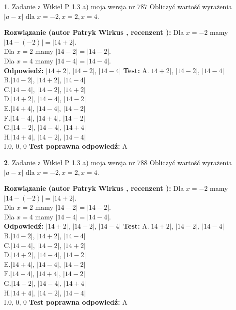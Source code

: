 \documentclass[12pt, a4paper]{article}
\theoremstyle{definition} %
\newtheorem{zad}{}
\newcommand{\zadStart}[1]{\begin{zad}#1\newline}
\newcommand{\zadStop}{\end{zad}}
\newcommand{\rozwStart}[2]{\noindent \textbf{Rozwiązanie (autor #1 , recenzent #2): }\newline}
\newcommand{\rozwStop}{\newline}
\newcommand{\odpStart}{\noindent \textbf{Odpowiedź:}\newline}
\newcommand{\odpStop}{\newline}
\newcommand{\testStart}{\noindent \textbf{Test:}\newline}
\newcommand{\testStop}{\newline}
\newcommand{\kluczStart}{\noindent \textbf{Test poprawna odpowiedź:}\newline}
\newcommand{\kluczStop}{\newline}
\begin{document}
\zadStart{Zadanie z Wikieł P 1.3 a) moja wersja nr 787}
Obliczyć wartość wyrażenia $|a - x|$ dla $x=-2,x=2,x=4$.
\zadStop
\rozwStart{Patryk Wirkus}{}
Dla $x = -2$ mamy $|14 - (-2)| = |14 + 2|$.\\
Dla $x = 2$ mamy $|14 - 2| = |14 - 2|$.\\
Dla $x = 4$ mamy $|14 - 4| = |14 - 4|$.\\
\rozwStop
\odpStart
$|14 + 2|$, $|14 - 2|$, $|14 - 4|$
\odpStop
\testStart
A.$|14 + 2|$, $|14 - 2|$, $|14 - 4|$\\
B.$|14 - 2|$, $|14 + 2|$, $|14 - 4|$\\
C.$|14 - 4|$, $|14 - 2|$, $|14 + 2|$\\
D.$|14 + 2|$, $|14 - 4|$, $|14 - 2|$\\
E.$|14 + 4|$, $|14 - 4|$, $|14 - 2|$\\
F.$|14 - 4|$, $|14 + 4|$, $|14 - 2|$\\
G.$|14 - 2|$, $|14 - 4|$, $|14 + 4|$\\
H.$|14 + 4|$, $|14 - 2|$, $|14 - 4|$\\
I.$0$, $0$, $0$
\testStop
\kluczStart
A
\kluczStop



\zadStart{Zadanie z Wikieł P 1.3 a) moja wersja nr 788}
Obliczyć wartość wyrażenia $|a - x|$ dla $x=-2,x=2,x=4$.
\zadStop
\rozwStart{Patryk Wirkus}{}
Dla $x = -2$ mamy $|14 - (-2)| = |14 + 2|$.\\
Dla $x = 2$ mamy $|14 - 2| = |14 - 2|$.\\
Dla $x = 4$ mamy $|14 - 4| = |14 - 4|$.\\
\rozwStop
\odpStart
$|14 + 2|$, $|14 - 2|$, $|14 - 4|$
\odpStop
\testStart
A.$|14 + 2|$, $|14 - 2|$, $|14 - 4|$\\
B.$|14 - 2|$, $|14 + 2|$, $|14 - 4|$\\
C.$|14 - 4|$, $|14 - 2|$, $|14 + 2|$\\
D.$|14 + 2|$, $|14 - 4|$, $|14 - 2|$\\
E.$|14 + 4|$, $|14 - 4|$, $|14 - 2|$\\
F.$|14 - 4|$, $|14 + 4|$, $|14 - 2|$\\
G.$|14 - 2|$, $|14 - 4|$, $|14 + 4|$\\
H.$|14 + 4|$, $|14 - 2|$, $|14 - 4|$\\
I.$0$, $0$, $0$
\testStop
\kluczStart
A
\kluczStop
\end{document}
